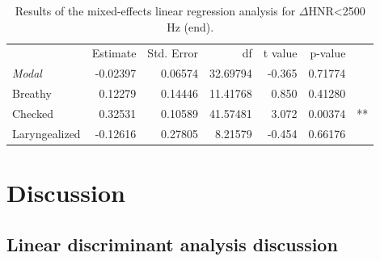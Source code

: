 \documentclass[12pt, letterpaper]{article}
\providecommand{\lsptoprule}{\midrule\toprule}
\providecommand{\lspbottomrule}{\bottomrule\midrule}
\begin{document}
\begin{table}[!h]
    \centering
    \caption{Results of the mixed-effects linear regression analysis for $ \Delta $HNR<2500 Hz (end).}
    \label{tab:delta}
    \begin{tabular}{lrrrrrl}
	\lsptoprule
					&  Estimate  & Std. Error & df & t value & p-value & \\
        \textit{Modal}  &   -0.02397 &   0.06574  & 32.69794 & -0.365 & 0.71774 & \\  
  	Breathy   		&    0.12279 &   0.14446  & 11.41768 &  0.850 & 0.41280 & \\
	Checked    		&    0.32531 &   0.10589  & 41.57481 &  3.072 & 0.00374 & ** \\
	Laryngealized	&   -0.12616 &   0.27805  &  8.21579 & -0.454 & 0.66176 & \\
    \lspbottomrule
    \end{tabular}
\end{table}

\section{Discussion} \label{sec:Discussion}

\subsection{Linear discriminant analysis discussion} \label{sec:DiscussionLDA}
\end{document}
